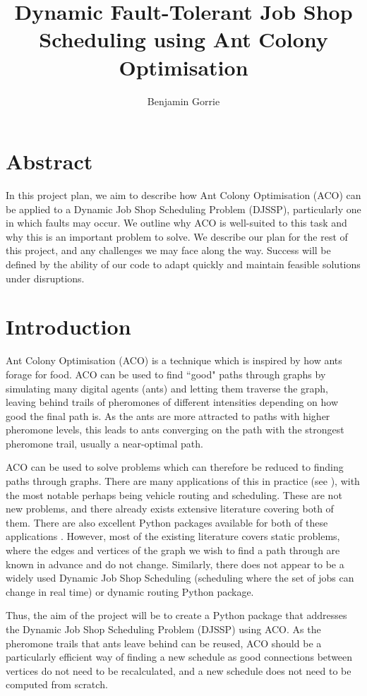 \documentclass[project-plan]{report-template}
\title{Dynamic Fault-Tolerant Job Shop Scheduling using Ant Colony Optimisation}
\author{Benjamin Gorrie}
\begin{document}
\maketitlepage  %

\section*{Abstract}
In this project plan, we aim to describe how Ant Colony Optimisation (ACO) can be applied to a Dynamic Job Shop Scheduling Problem (DJSSP), particularly one in which faults may occur. We outline why ACO is well-suited to this task and why this is an important problem to solve. We describe our plan for the rest of this project, and any challenges we may face along the way. Success will be defined by the ability of our code to adapt quickly and maintain feasible solutions under disruptions.

\tableofcontents

\section{Introduction}
Ant Colony Optimisation (ACO) is a technique which is inspired by how ants forage for food. ACO can be used to find ``good" paths through graphs by simulating many digital agents (ants) and letting them traverse the graph, leaving behind trails of pheromones of different intensities depending on how good the final path is. As the ants are more attracted to paths with higher pheromone levels, this leads to ants converging on the path with the strongest pheromone trail, usually a near-optimal path.

ACO can be used to solve problems which can therefore be reduced to finding paths through graphs. There are many applications of this in practice (see \cite{enwiki:1292514538}), with the most notable perhaps being vehicle routing and scheduling. These are not new problems, and there already exists extensive literature covering both of them. There are also excellent Python packages available for both of these applications \cite{Wouda_Lan_Kool_PyVRP_2024} \cite{jobshoplib}. However, most of the existing literature covers static problems, where the edges and vertices of the graph we wish to find a path through are known in advance and do not change. Similarly, there does not appear to be a widely used Dynamic Job Shop Scheduling (scheduling where the set of jobs can change in real time) or dynamic routing Python package. 

Thus, the aim of the project will be to create a Python package that addresses the Dynamic Job Shop Scheduling Problem (DJSSP) using ACO. As the pheromone trails that ants leave behind can be reused, ACO should be a particularly efficient way of finding a new schedule as good connections between vertices do not need to be recalculated, and a new schedule does not need to be computed from scratch. 
\end{document}
